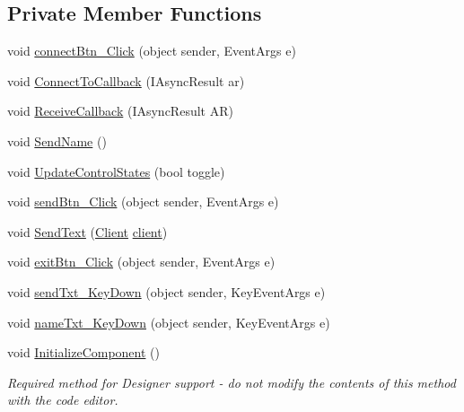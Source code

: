 \subsection*{Private Member Functions}
\begin{DoxyCompactItemize}
\item 
void \hyperlink{class_socket_client_1_1_socket_client_a938dd095e77445dbc0ac020da5023571}{connect\+Btn\+\_\+\+Click} (object sender, Event\+Args e)
\item 
void \hyperlink{class_socket_client_1_1_socket_client_a9f94765a98f16857de0abb270fbe9679}{Connect\+To\+Callback} (I\+Async\+Result ar)
\item 
void \hyperlink{class_socket_client_1_1_socket_client_ace38e3f7f43d32563ffb8f20cfa9ee19}{Receive\+Callback} (I\+Async\+Result AR)
\item 
void \hyperlink{class_socket_client_1_1_socket_client_aa5bdeccde8564ade04ece861218ba7f3}{Send\+Name} ()
\item 
void \hyperlink{class_socket_client_1_1_socket_client_aa3a0cd25dc845093679adab2eabcf118}{Update\+Control\+States} (bool toggle)
\item 
void \hyperlink{class_socket_client_1_1_socket_client_a93f0c7db922616b4f322433adc3a220e}{send\+Btn\+\_\+\+Click} (object sender, Event\+Args e)
\item 
void \hyperlink{class_socket_client_1_1_socket_client_a0ffad9543c6accf3fa6a6d957b34feb9}{Send\+Text} (\hyperlink{class_socket_client_1_1_client}{Client} \hyperlink{class_socket_client_1_1_socket_client_a09a6b075aa1a2e8669cf52466e28b988}{client})
\item 
void \hyperlink{class_socket_client_1_1_socket_client_ad67a72749598ea2ceeb026e4cb5469c7}{exit\+Btn\+\_\+\+Click} (object sender, Event\+Args e)
\item 
void \hyperlink{class_socket_client_1_1_socket_client_a38f11d5c2815b7b4d2aeb8cdf52f422b}{send\+Txt\+\_\+\+Key\+Down} (object sender, Key\+Event\+Args e)
\item 
void \hyperlink{class_socket_client_1_1_socket_client_aa7b8455ed40a53e2a6c89b797d34655c}{name\+Txt\+\_\+\+Key\+Down} (object sender, Key\+Event\+Args e)
\item 
void \hyperlink{class_socket_client_1_1_socket_client_ae31dc82e1b1d076129b128b42886be56}{Initialize\+Component} ()
\begin{DoxyCompactList}\small\item\em Required method for Designer support -\/ do not modify the contents of this method with the code editor. \end{DoxyCompactList}\end{DoxyCompactItemize}
